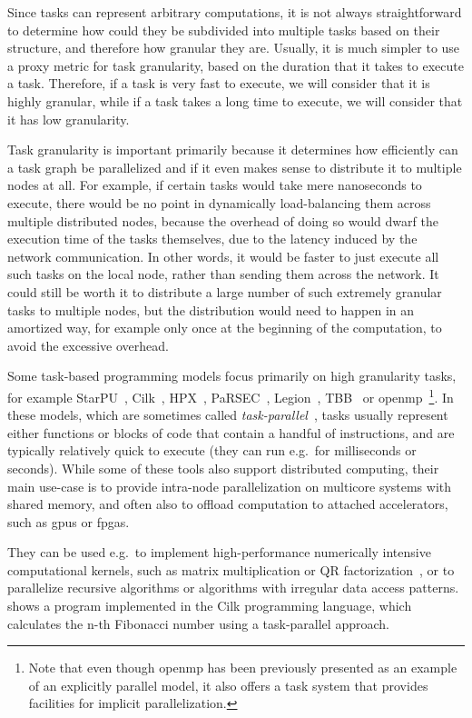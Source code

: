 Since tasks can represent arbitrary computations, it is not always straightforward to determine how
could they be subdivided into multiple tasks based on their structure, and therefore how granular
they are. Usually, it is much simpler to use a proxy metric for task granularity, based on the
duration that it takes to execute a task. Therefore, if a task is very fast to execute, we will
consider that it is highly granular, while if a task takes a long time to execute, we will consider
that it has low granularity.

Task granularity is important primarily because it determines how efficiently can a task graph be
parallelized and if it even makes sense to distribute it to multiple nodes at all. For example, if
certain tasks would take mere nanoseconds to execute, there would be no point in dynamically
load-balancing them across multiple distributed nodes, because the overhead of doing so would dwarf
the execution time of the tasks themselves, due to the latency induced by the network
communication. In other words, it would be faster to just execute all such tasks on the local node,
rather than sending them across the network. It could still be worth it to distribute a large
number of such extremely granular tasks to multiple nodes, but the distribution would need to
happen in an amortized way, for example only once at the beginning of the computation, to avoid the
excessive overhead.

Some task-based programming models focus primarily on high granularity tasks, for example
StarPU~\cite{starpu}, Cilk~\cite{cilk},
HPX~\cite{hpx}, PaRSEC~\cite{parsec},
Legion~\cite{legion}, TBB~\cite{tbb} or
\gls{openmp}~\cite{openmp}\footnote{Note that even though \gls{openmp} has been previously presented as an example of an
explicitly parallel model, it also offers a task system that provides facilities for implicit parallelization.}. In these
models, which are sometimes called \emph{task-parallel}~\cite{task_based_taxonomy}, tasks usually represent either
functions or blocks of code that contain a handful of instructions, and are typically relatively
quick to execute (they can run e.g.\ for milliseconds or seconds). While some of these tools also
support distributed computing, their main use-case is to provide intra-node parallelization on
multicore systems with shared memory, and often also to offload computation to attached
accelerators, such as \glspl{gpu} or \glspl{fpga}.

They can be used e.g.\ to implement high-performance numerically intensive computational kernels,
such as matrix multiplication or QR factorization~\cite{qr_factorization}, or to parallelize
recursive algorithms or algorithms with irregular data access patterns. 
shows a program implemented in the Cilk programming language, which calculates the n-th Fibonacci
number using a task-parallel approach.

